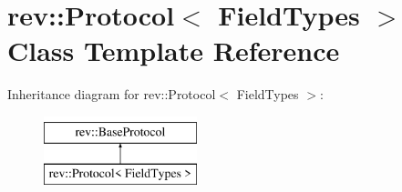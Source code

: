 \hypertarget{classrev_1_1_protocol}{}\section{rev\+::Protocol$<$ Field\+Types $>$ Class Template Reference}
\label{classrev_1_1_protocol}
Inheritance diagram for rev\+::Protocol$<$ Field\+Types $>$\+:\begin{figure}[H]
\begin{center}
\leavevmode
\includegraphics[height=2.000000cm]{classrev_1_1_protocol}
\end{center}
\end{figure}
